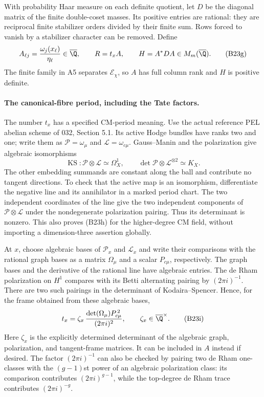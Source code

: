 With probability Haar measure on each definite quotient,
let $D$ be the diagonal matrix of the finite double-coset
masses.  Its positive entries are rational: they are
reciprocal finite stabilizer orders divided by their
finite sum.  Rows forced to vanish by a stabilizer
character can be removed.  Define
\[
 A_{\ell j}=\frac{\omega_j(x_\ell)}{\eta_\ell}
       \in\overline\Q,
 \qquad R=t_x A,
 \qquad H=A^*DA\in M_m(\overline\Q).
 \tag{B23g}
\]
The finite family in A5 separates $\mathcal E_\chi$, so
$A$ has full column rank and $H$ is positive definite.

\paragraph{The canonical-fibre period, including the Tate factors.}
The number $t_x$ has a specified CM-period meaning.  Use
the actual reference PEL abelian scheme of 032, Section
5.1.  Its active Hodge bundles have ranks two and one;
write them as $\mathcal P=\omega_\mu$ and
$\mathcal L=\omega_{c\mu}$.  Gauss--Manin and the
polarization give algebraic isomorphisms
\[
 \operatorname{KS}:\mathcal P\otimes\mathcal L
                         \simeq\Omega_X^1,
 \qquad
 \det\mathcal P\otimes\mathcal L^{\otimes2}
                         \simeq K_X.
 \tag{B23h}
\]
The other embedding summands are constant along the ball
and contribute no tangent directions.  To check that
the active map is an isomorphism, differentiate the
negative line and its annihilator in a marked period
chart.  The two independent coordinates of the line
give the two independent components of
$\mathcal P\otimes\mathcal L$ under the nondegenerate
polarization pairing.  Thus its determinant is nonzero.
This also proves (B23h) for the higher-degree CM field,
without importing a dimension-three assertion globally.

At $x$, choose algebraic bases of $\mathcal P_x$ and
$\mathcal L_x$ and write their comparisons with the
rational graph bases as a matrix $\Omega_\mu$ and a
scalar $P_{c\mu}$, respectively.  The graph bases and
the derivative of the rational line have algebraic
entries.  The de Rham polarization on $H^1$ compares
with its Betti alternating pairing by $(2\pi i)^{-1}$.
There are two such pairings in the determinant of
Kodaira--Spencer.  Hence, for the frame obtained from
these algebraic bases,
\[
 t_x=\zeta_x\,
       \frac{\det(\Omega_\mu)P_{c\mu}^{\,2}}
                         {(2\pi i)^2},
                 \qquad\zeta_x\in\overline\Q^\times.
 \tag{B23i}
\]
Here $\zeta_x$ is the explicitly determined determinant
of the algebraic graph, polarization, and tangent-frame
matrices.  It can be included in $A$ instead if desired.
The factor $(2\pi i)^{-1}$ can also be checked by pairing
two de Rham one-classes with the $(g-1)$st power of an
algebraic polarization class: its comparison contributes
$(2\pi i)^{g-1}$, while the top-degree de Rham trace
contributes $(2\pi i)^{-g}$.

